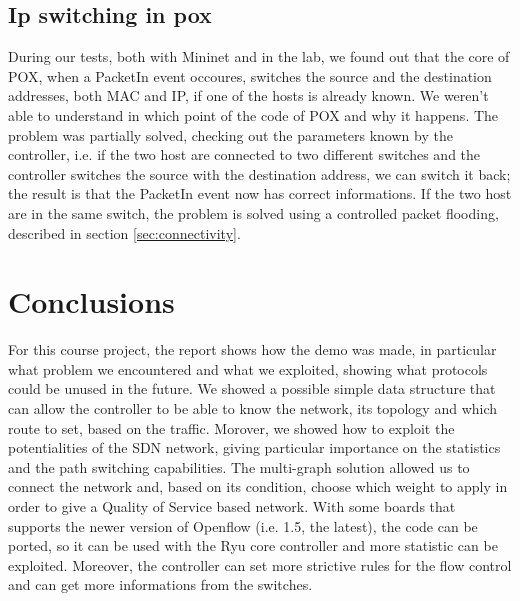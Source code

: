 \documentclass[article,10pt]{IEEEtran}
\begin{document}
\subsection{Ip switching in pox}
During our tests, both with Mininet and in the lab, we found out that the core of POX, when a PacketIn event occoures, switches the source and the destination addresses,
both MAC and IP, if one of the hosts is already known. We weren't able to understand in which point of the code of POX  and why it happens.
The problem was partially solved, checking out the
parameters known by the controller, i.e. if the two host are connected to two different switches and the controller switches the source with the
destination address, we can switch it back; the result is that the PacketIn event now has correct informations.
If the two host are in the same switch, the problem is solved using a controlled packet flooding, described in section \ref{sec:connectivity}.

\section{Conclusions}\label{sec:conclusion}
For this course project, the report shows how the demo was made, in particular what problem we encountered
and what we exploited, showing what protocols could be unused in the future. We showed a possible simple data structure
that can allow the controller to be able to know the network, its topology and which route to set, based on the traffic.
Morover, we showed how to exploit the potentialities of the SDN network, giving particular importance on the
statistics and the path switching capabilities.
The multi-graph solution allowed us to connect the network and, based on its condition, choose which weight to apply
in order to give a Quality of Service based network. With some boards that supports the newer version of Openflow
(i.e. 1.5, the latest), the code can be ported, so it can be used with the Ryu core controller and more statistic can
be exploited. Moreover, the controller can set more strictive rules for the flow control and can get more informations from the
switches.

\end{document}
